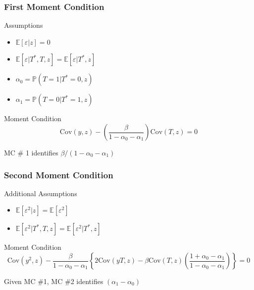 \documentclass{beamer}
\begin{document}
\begin{frame}
  \frametitle{First Moment Condition}
  \begin{block}{Assumptions}
    \begin{itemize}
      \item $\mathbb{E}[\varepsilon|z]=0$
      \item $\mathbb{E}[\varepsilon|T^*,T,z] =  \mathbb{E}[\varepsilon|T^*,z]$
      \item $\alpha_0 = \mathbb{P}(T = 1| T^* = 0, z)$ 
      \item  $\alpha_1 = \mathbb{P}(T = 0| T^* = 1, z)$ 
    \end{itemize}
  \end{block}

  \begin{block}{Moment Condition}
    \[\mbox{Cov}(y,z) - \left( \frac{\beta}{1 - \alpha_0 - \alpha_1} \right) \mbox{Cov}(T,z) = 0\]
  \end{block}

  \alert{MC \# 1 identifies $\beta/(1 - \alpha_0 - \alpha_1)$}
\end{frame}
\begin{frame}
  \frametitle{Second Moment Condition}
  \begin{block}{Additional Assumptions}
    \begin{itemize}
      \item $\mathbb{E}[\varepsilon^2|z]=\mathbb{E}[\varepsilon^2]$
      \item $\mathbb{E}[\varepsilon^2|T^*,T,z] =  \mathbb{E}[\varepsilon^2|T^*,z]$
    \end{itemize}
  \end{block}

  \begin{block}{Moment Condition}
    \small
  \[\mbox{Cov}(y^2,z) - \frac{\beta}{1 - \alpha_0 - \alpha_1}\left\{2\mbox{Cov}(yT,z)- \beta \mbox{Cov}(T,z)\left( \frac{1 + \alpha_0 - \alpha_1}{1 - \alpha_0 - \alpha_1} \right)  \right\} = 0\]
  \end{block}

  \alert{Given MC \#1, MC \#2 identifies $(\alpha_1 - \alpha_0)$}
\end{frame}
\end{document}

